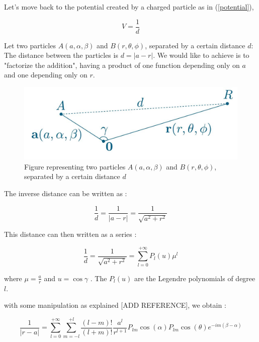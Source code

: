 \documentclass[10pt,twoside,a4paper]{report}
\begin{document}
	Let's move back to the potential created by a charged particle as in (\ref{potential}),
	
	\begin{equation*}
	V = \frac{1}{d}
	\end{equation*}
	
	Let two particles $A(a,\alpha,\beta)$ and $B(r,\theta,\phi)$, separated by a certain distance $d$: The distance between the particles is $d = |a - r|$.
	We would like to achieve is to "factorize the addition", having a product of one function depending only on $a$ and one depending only on $r$.
	
	
\begin{figure}[H]
\includegraphics[scale=0.4]{distance}
 \centering 
\caption{Figure representing two particles $A(a,\alpha,\beta)$ and $B(r,\theta,\phi)$, separated by a certain distance $d$}
\label{fig:poster}
\end{figure}	
	
	
	The inverse distance can be written as :
	
	\begin{equation*}
		\frac{1}{d} = \frac{1}{|a-r|} = \frac{1}{\sqrt{a^2 + r^2}}
	\end{equation*}

	This distance can then written as a series :
	
	\begin{equation}
		\frac{1}{d} = \frac{1}{\sqrt{a^2 + r^2}} = \sum\limits_{l=0}^{+\infty} P_l(u)\mu^l
	\end{equation}
	
	
	where $\mu = \frac{a}{r}$ and $u = \cos{\gamma}$ . The $P_l(u)$ are the Legendre polynomials of degree $l$.
	
	with some manipulation as explained [ADD REFERENCE], we obtain : 
	
	\begin{equation}
	\frac{1}{|r - a|} = \sum\limits_{l=0}^{+\infty} \sum\limits_{m = -l}^{+l} \frac{(l-m)!}{(l+m)!} \frac{a^l}{r^{l+1}} P_{lm}\cos{(\alpha)}P_{lm}\cos{(\theta)}e^{-im(\beta - \alpha)}
	\end{equation}
	
\end{document}

